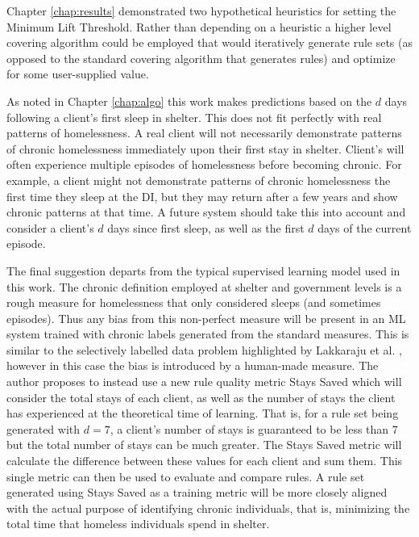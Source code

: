 
Chapter \ref{chap:results} demonstrated two hypothetical heuristics for setting the Minimum Lift Threshold. Rather than depending on a heuristic a higher level covering algorithm could be employed that would iteratively generate rule sets (as opposed to the standard covering algorithm that generates rules) and optimize for some user-supplied value.

As noted in Chapter \ref{chap:algo} this work makes predictions based on the $d$ days following a client's first sleep in shelter. This does not fit perfectly with real patterns of homelessness. A real client will not necessarily demonstrate patterns of chronic homelessness immediately upon their first stay in shelter. Client's will often experience multiple episodes of homelessness before becoming chronic. For example, a client might not demonstrate patterns of chronic homelessness the first time they sleep at the DI, but they may return after a few years and show chronic patterns at that time. A future system should take this into account and consider a client's $d$ days since first sleep, as well as the first $d$ days of the current episode.

The final suggestion departs from the typical supervised learning model used in this work. The chronic definition employed at shelter and government levels is a rough measure for homelessness that only considered sleeps (and sometimes episodes). Thus any bias from this non-perfect measure will be present in an ML system trained with chronic labels generated from the standard measures. This is similar to the selectively labelled data problem highlighted by Lakkaraju et al. \cite{lakkaraju2017selective}, however in this case the bias is introduced by a human-made measure.
The author proposes to instead use a new rule quality metric Stays Saved \cite{messier2020} which will consider the total stays of each client, as well as the number of stays the client has experienced at the theoretical time of learning. That is, for a rule set being generated with $d=7$, a client's number of stays is guaranteed to be less than 7 but the total number of stays can be much greater. The Stays Saved metric will calculate the difference between these values for each client and sum them. This single metric can then be used to evaluate and compare rules. A rule set generated using Stays Saved as a training metric will be more closely aligned with the actual purpose of identifying chronic individuals, that is, minimizing the total time that homeless individuals spend in shelter. 